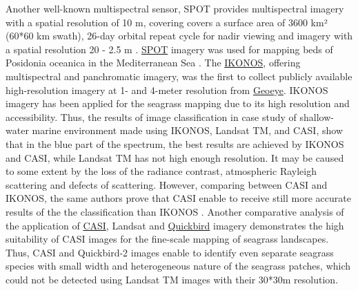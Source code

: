 \documentclass[10pt, a4paper]{article}
\begin{document}
Another well-known multispectral sensor, SPOT provides multispectral imagery with a spatial
resolution of 10 m, covering covers a surface area of 3600 km² (60*60 km swath), 26-day
orbital repeat cycle for nadir viewing and imagery with a spatial resolution 20 - 2.5 m
\cite{SPOT}\label{SPOT}. \href{http://www.spotimage.fr/}{SPOT} imagery was used for mapping beds of Posidonia oceanica in the
Mediterranean Sea \cite{Pasqualini05} \label{Pasqualini05}. The \href{http://www.satimagingcorp.com/gallery-ikonos.html}{IKONOS}, offering multispectral and panchromatic imagery, was the first to collect publicly
available high-resolution imagery at 1- and 4-meter resolution from \href{http://www.geoeye.com}{Geoeye}. IKONOS
imagery has been applied for the seagrass mapping due to its high resolution and accessibility. Thus,
the results of image classification in case study of shallow-water marine environment \cite{Mumby02}\label{Mumby02}
made using IKONOS, Landsat TM, and CASI, show that in the blue part of the
spectrum, the best results are achieved by IKONOS and CASI, while Landsat TM has not high
enough resolution. It may be caused to some extent by the loss of the radiance contrast, atmospheric
Rayleigh scattering and defects of scattering. However, comparing between CASI and IKONOS, the
same authors prove that CASI enable to receive still more accurate results of the the classification
than IKONOS \cite{Mumby02}\label{Mumby02}.
Another comparative analysis of the application of \href{http://www.itres.com/products/imagers/casi550}{CASI}, Landsat and \href{http://www.digitalglobe.com/index.php/85/QuickBird}{Quickbird} imagery \cite{Phinn08}\label{Phinn08}
 demonstrates the high suitability of CASI images for the fine-scale mapping of seagrass
landscapes. Thus, CASI and Quickbird-2 images enable to identify even separate seagrass species
with small width and heterogeneous nature of the seagrass patches, which could not be detected using
Landsat TM images with their 30*30m resolution.
\end{document}
